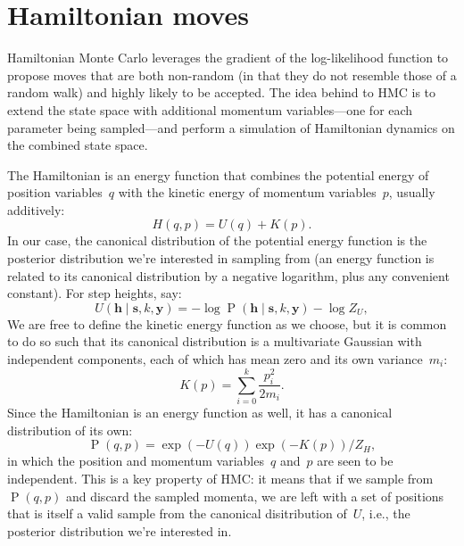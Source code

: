\documentclass[11pt,a4paper]{article}
\newcommand\ub[1]{\symbf{#1}}                    %
\DeclareMathOperator\Pb{P}                       %
\theoremstyle{definition}
\begin{document}
\section{Hamiltonian moves} %

Hamiltonian Monte Carlo leverages the gradient of the log-likelihood function to
propose moves that are both non-random (in that they do not resemble those of a
random walk) and highly likely to be accepted. The idea behind to HMC is to
extend the state space with additional momentum variables---one for each
parameter being sampled---and perform a simulation of Hamiltonian dynamics on
the combined state space.

The Hamiltonian is an energy function that combines the potential energy of
position variables~$q$ with the kinetic energy of momentum variables~$p$,
usually additively:
\[ H(q,p) = U(q) + K(p). \]
In our case, the canonical distribution of the potential energy function is the
posterior distribution we're interested in sampling from (an energy function is
related to its canonical distribution by a negative logarithm, plus any
convenient constant). For step heights, say:
\begin{equation}\label{eqn:potential h}
  U(\ub{h} \mid \ub{s},k,\ub{y}) = -\log\Pb(\ub{h} \mid \ub{s},k,\ub{y})
    - \log Z_U,
\end{equation}
We are free to define the kinetic energy function as we choose, but it is common
to do so such that its canonical distribution is a multivariate Gaussian with
independent components, each of which has mean zero and its own variance~$m_i$:
\begin{equation}\label{eqn:kinetic}
  K(p) = \sum_{i=0}^k \frac{p_i^2}{2m_i}.
\end{equation}
Since the Hamiltonian is an energy function as well, it has a canonical
distribution of its own:
\[ \Pb(q,p) = \exp(-U(q))\exp(-K(p))/Z_H, \]
in which the position and momentum variables~$q$ and~$p$ are seen to be
independent. This is a key property of HMC: it means that if we sample
from~$\Pb(q,p)$ and discard the sampled momenta, we are left with a set of
positions that is itself a valid sample from the canonical disitribution of~$U$,
i.e., the posterior distribution we're interested in. 
\end{document}
